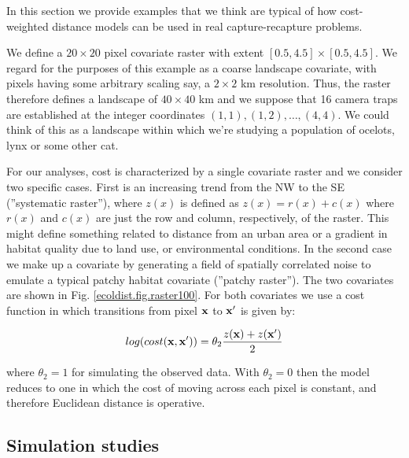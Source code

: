 \documentclass[12pt]{article}
\begin{document}
In this section we provide examples that we think are typical of
how cost-weighted distance models can be used in real
capture-recapture problems.

We define a $20 \times 20$ pixel covariate raster with extent $[0.5, 4.5] \times
[0.5, 4.5]$.  We regard for the purposes of this example as a coarse
landscape covariate, with pixels having some arbitrary scaling say, a
$2 \times 2$ km resolution. Thus, the raster therefore defines a
landscape of $40 \times 40$ km and we suppose that 16 camera traps are
established at the integer coordinates $(1,1), (1,2), \ldots,
(4,4)$. We could think of this as a landscape within which we're
studying a population of ocelots, lynx or some other cat.

For our analyses, cost is characterized by a
single covariate raster and we consider two specific cases. First is an
increasing trend from the NW to the SE (''systematic raster''), where $z(x)$ is defined as
$z(x) = r(x) + c(x)$ where $r(x)$ and $c(x)$ are just the row and
column, respectively, of the raster.  This might define something
related to distance from an urban area or a gradient in habitat
quality due to land use, or environmental conditions.  In the second
case we make up a covariate by generating a field of spatially
correlated noise to emulate a typical patchy habitat covariate (''patchy raster''). The
two covariates are shown in Fig. \ref{ecoldist.fig.raster100}. For
both covariates we use a cost function in which transitions from
pixel ${\bf x}$ to ${\bf x}'$ is given by:

\[
 log(cost({\bf x},{\bf x}'))=  \theta_2 \frac{z({\bf x}) + z({\bf x}')}{2}
\]

{\flushleft where} $\theta_2 = 1$ for simulating the observed data.
 With $\theta_2=0$ then the
model reduces to one in which the cost of moving across each pixel is
constant, and therefore Euclidean distance is operative.

\subsection{Simulation studies}
\end{document}
